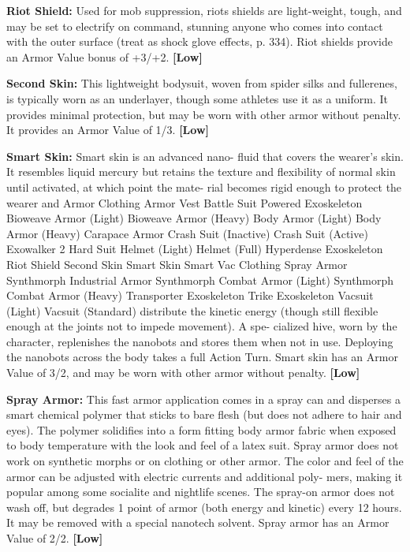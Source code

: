\textbf{Riot Shield:} Used for mob suppression, riots shields 
are light-weight, tough, and may be set to electrify on 
command, stunning anyone who comes into contact 
with the outer surface (treat as shock glove effects, p. 
334). Riot shields provide an Armor Value bonus of 
+3/+2. \textbf{[Low]}

\textbf{Second Skin:} This lightweight bodysuit, woven 
from spider silks and fullerenes, is typically worn 
as an underlayer, though some athletes use it as a 
uniform. It provides minimal protection, but may be 
worn with other armor without penalty. It provides an 
Armor Value of 1/3. \textbf{[Low]}

\textbf{Smart Skin:} Smart skin is an advanced nano-
fluid that covers the wearer's skin. It resembles liquid 
mercury but retains the texture and flexibility  of 
normal skin until activated, at which point the mate-
rial becomes rigid enough to protect the wearer and 
Armor Clothing 
Armor Vest 
Battle Suit Powered Exoskeleton 
Bioweave Armor (Light) 
Bioweave Armor (Heavy) 
Body Armor (Light) 
Body Armor (Heavy) 
Carapace Armor  
Crash Suit (Inactive) 
Crash Suit (Active) 
Exowalker 2
Hard Suit 
Helmet (Light) 
Helmet (Full) 
Hyperdense Exoskeleton 
Riot Shield 
Second Skin 
Smart Skin 
Smart Vac Clothing
Spray Armor 
Synthmorph Industrial Armor  
Synthmorph Combat Armor (Light) 
Synthmorph Combat Armor (Heavy) 
Transporter Exoskeleton 
Trike Exoskeleton 
Vacsuit (Light)  
Vacsuit (Standard)  
distribute the kinetic energy (though still flexible 
enough at the joints not to impede movement). A spe-
cialized hive, worn by the character, replenishes the 
nanobots and stores them when not in use. Deploying 
the nanobots across the body takes a full Action Turn. 
Smart skin has an Armor Value of 3/2, and may be 
worn with other armor without penalty. \textbf{[Low]}

\textbf{Spray Armor:} This fast armor application comes in 
a spray can and disperses a smart chemical polymer 
that sticks to bare flesh (but does not adhere to hair 
and eyes). The polymer solidifies into a form fitting 
body armor fabric when exposed to body temperature 
with the look and feel of a latex suit. Spray armor 
does not work on synthetic morphs or on clothing or 
other armor. The color and feel of the armor can be 
adjusted with electric currents and additional poly-
mers, making it popular among some socialite and 
nightlife scenes. The spray-on armor does not wash 
off, but degrades 1 point of armor (both energy and 
kinetic) every 12 hours. It may be removed with a 
special nanotech solvent. Spray armor has an Armor 
Value of 2/2. \textbf{[Low]}

